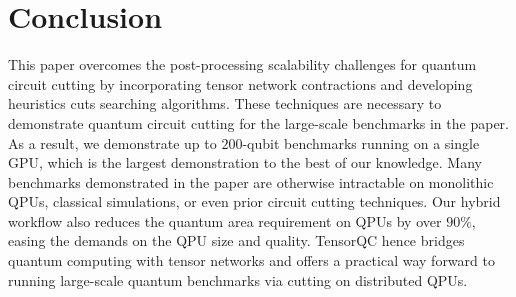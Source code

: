 \section{Conclusion}\label{sec:conclusion}
This paper overcomes the post-processing scalability challenges for quantum circuit cutting
by incorporating tensor network contractions and developing heuristics cuts searching algorithms.
These techniques are necessary to demonstrate quantum circuit cutting for the large-scale benchmarks in the paper.
As a result, we demonstrate up to $200$-qubit benchmarks running on a single GPU,
which is the largest demonstration to the best of our knowledge.
Many benchmarks demonstrated in the paper are otherwise intractable on monolithic QPUs,
classical simulations, or even prior circuit cutting techniques.
Our hybrid workflow also reduces the quantum area requirement on QPUs by over $90\%$,
easing the demands on the QPU size and quality.
TensorQC hence bridges quantum computing with tensor networks and offers a practical way forward to running large-scale quantum benchmarks via cutting on distributed QPUs.